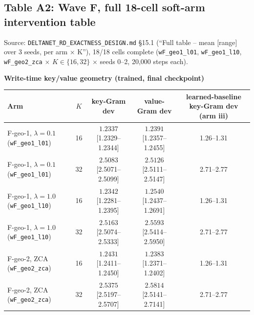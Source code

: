 \clearpage
\subsection{Table A2: Wave F, full 18-cell soft-arm intervention table}
\label{tab:a2-wavef}

Source: \texttt{DELTANET\_RD\_EXACTNESS\_DESIGN.md} \S15.1 (``Full table
-- mean [range] over 3 seeds, per arm $\times$ K''), 18/18 cells complete
(\texttt{wF\_geo1\_l01}, \texttt{wF\_geo1\_l10}, \texttt{wF\_geo2\_zca}
$\times$ $K\in\{16,32\}$ $\times$ seeds 0--2, 20{,}000 steps each).

\begin{table}[htbp]
\centering
\scriptsize
\textbf{Write-time key/value geometry (trained, final checkpoint)}\\[2pt]
\begin{tabular}{lcccc}
\toprule
Arm & $K$ & key-Gram dev & value-Gram dev & learned-baseline key-Gram dev (arm iii) \\
\midrule
F-geo-1, $\lambda{=}0.1$ (\texttt{wF\_geo1\_l01}) & 16 & $1.2337$ [1.2329--1.2344] & $1.2391$ [1.2357--1.2455] & 1.26--1.31 \\
F-geo-1, $\lambda{=}0.1$ (\texttt{wF\_geo1\_l01}) & 32 & $2.5083$ [2.5071--2.5099] & $2.5126$ [2.5111--2.5147] & 2.71--2.77 \\
F-geo-1, $\lambda{=}1.0$ (\texttt{wF\_geo1\_l10}) & 16 & $1.2342$ [1.2281--1.2395] & $1.2540$ [1.2437--1.2691] & 1.26--1.31 \\
F-geo-1, $\lambda{=}1.0$ (\texttt{wF\_geo1\_l10}) & 32 & $2.5163$ [2.5074--2.5333] & $2.5593$ [2.5414--2.5950] & 2.71--2.77 \\
F-geo-2, ZCA (\texttt{wF\_geo2\_zca}) & 16 & $1.2431$ [1.2411--1.2450] & $1.2383$ [1.2371--1.2402] & 1.26--1.31 \\
F-geo-2, ZCA (\texttt{wF\_geo2\_zca}) & 32 & $2.5375$ [2.5197--2.5707] & $2.5814$ [2.5141--2.7141] & 2.71--2.77 \\
\bottomrule
\end{tabular}


\end{table}
